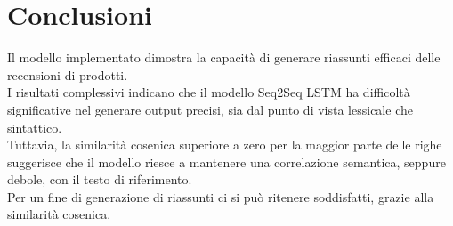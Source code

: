 \documentclass[a4paper, 12pt]{article}
\begin{document}
\section{Conclusioni}
Il modello implementato dimostra la capacità di generare riassunti efficaci delle recensioni di prodotti.\\
I risultati complessivi indicano che il modello Seq2Seq LSTM ha difficoltà significative nel generare output precisi, sia dal punto di vista lessicale che sintattico. \\
Tuttavia, la similarità cosenica superiore a zero per la maggior parte delle righe suggerisce che il modello riesce a mantenere una correlazione semantica, seppure debole, con il testo di riferimento.\\
Per un fine di generazione di riassunti ci si può ritenere soddisfatti, grazie alla similarità cosenica.
\end{document}
